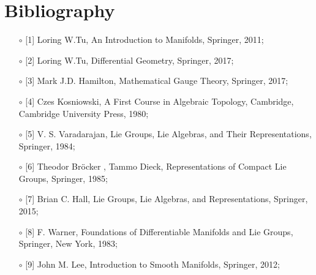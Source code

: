 \documentclass[12pt,a4paper]{report}
\theoremstyle{definition}
\theoremstyle{Theorem}
\theoremstyle{definition}
\theoremstyle{definition}
\begin{document}
	\chapter*{Bibliography}
	\begin{itemize}
		\item[$\circ$] [1] Loring W.Tu, An Introduction to Manifolds, Springer, 2011;
		\item[$\circ$] [2] Loring W.Tu, Differential Geometry, Springer, 2017;
		\item[$\circ$] [3] Mark J.D. Hamilton, Mathematical Gauge Theory, Springer, 2017;
		\item[$\circ$] [4] Czes Kosniowski, A First Course in Algebraic Topology, Cambridge, Cambridge University Press, 1980;
		\item[$\circ$] [5] V. S. Varadarajan, Lie Groups, Lie Algebras, and Their Representations, Springer, 1984;
		\item[$\circ$] [6] Theodor Bröcker , Tammo Dieck, Representations of Compact Lie Groups, Springer, 1985;
		\item[$\circ$] [7] Brian C. Hall, Lie Groups, Lie Algebras, and Representations, Springer, 2015;
		\item[$\circ$] [8] F. Warner, Foundations of Differentiable Manifolds and Lie Groups, Springer, New York, 1983;
		\item[$\circ$] [9] John M. Lee, Introduction to Smooth Manifolds, Springer, 2012;
	\end{itemize}
	
\end{document}
